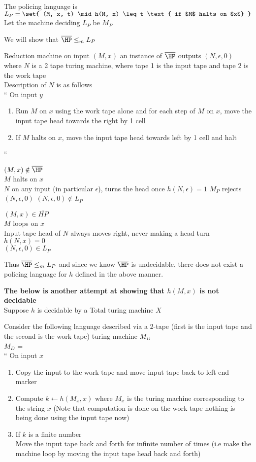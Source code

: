 The policing language is $L_P = \set{
    (M, x, t) \mid h(M, x) \leq t \text{ if $M$ halts on $x$}
}$
Let the machine deciding $L_P$ be $M_P$

We will show that $\overline{\HP} \leq_m L_P$

Reduction machine on input $(M, x)$ an instance of $\overline{\HP}$ outputs $(N, \epsilon, 0)$ where $N$ is a 2 tape turing machine, where tape 1 is the input tape and tape 2 is the work tape\\
Description of $N$ is as follows\\
``
On input $y$
\begin{enumerate}
    \item Run $M$ on $x$ using the work tape alone and for each step of $M$ on $x$, move the input tape head towards the right by 1 cell
    \item If $M$ halts on $x$, move the input tape head towards left by 1 cell and halt
\end{enumerate}

``

$(M, x) \notin \overline{\HP}$\\
\imp
$M$ halts on $x$\\
\imp
$N$ on any input (in particular $\epsilon$), turns the head once
\imp
$h(N, \epsilon) = 1$
\imp
$M_P$ rejects $(N, \epsilon, 0)$
\imp
$(N, \epsilon, 0) \notin L_P$

$(M, x) \in \overline{HP}$\\
\imp
$M$ loops on $x$\\
\imp
Input tape head of $N$ always moves right, never making a head turn\\
\imp
$h(N, x) = 0$\\
\imp
$(N, \epsilon, 0) \in L_P$

Thus $\overline{\HP} \leq_m L_P$ and since we know $\overline{\HP}$ is undecidable, there does not exist a policing language for $h$ defined in the above manner.

\textbf{The below is another attempt at showing that $h(M, x)$ is not decidable}\\
Suppose $h$ is decidable by a Total turing machine $X$

Consider the following language described via a 2-tape (first is the input tape and the second is the work tape) turing machine $M_D$\\
$M_D$ = \\
``
On input $x$
\begin{enumerate}
    \item Copy the input to the work tape and move input tape back to left end marker
    \item Compute $k \gets h(M_x, x)$ where $M_x$ is the turing machine corresponding to the string $x$ (Note that computation is done on the work tape nothing is being done using the input tape now)
    \item If $k$ is a finite number \\
    Move the input tape back and forth for infinite number of times (i.e make the machine loop by moving the input tape head back and forth)
\end{enumerate}


